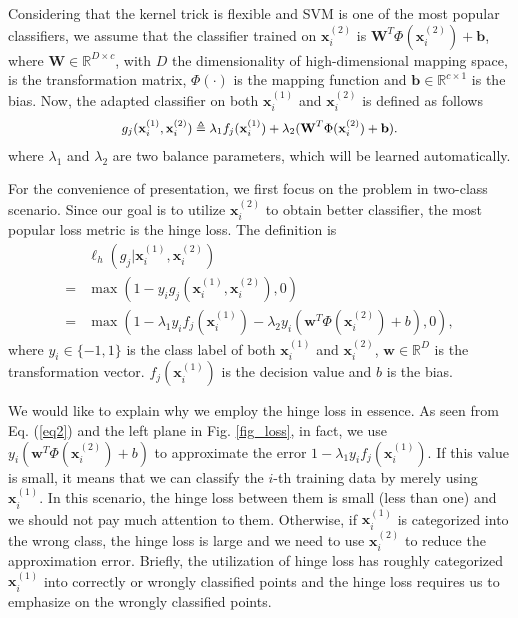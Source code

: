 \documentclass[10pt,journal,compsoc]{IEEEtran}
\begin{document}
Considering that the kernel trick is flexible and SVM is one of the most popular classifiers, we assume that the classifier trained on $\mathbf{x}_i^{(2)}$ is $\mathbf{W}^T \Phi(\mathbf{x}_i^{(2)})+\mathbf{b}$, where $\mathbf{W} \in \mathbb{R}^{D\times c}$, with $D$ the dimensionality of high-dimensional mapping space, is the transformation matrix, $\Phi(\cdot)$ is the mapping function and $\mathbf{b}\in \mathbb{R}^{c\times 1}$ is the bias. Now, the adapted classifier on both $\mathbf{x}_i^{(1)}$ and $\mathbf{x}_i^{(2)}$ is defined as follows
\begin{equation}
\label{eq1}
\small{
\begin{split}
g_j(\mathbf{x}_i^{(1)},\mathbf{x}_i^{(2)}) \triangleq \lambda_1 f_j(\mathbf{x}_i^{(1)})+\lambda_2 (\mathbf{W}^T \Phi(\mathbf{x}_i^{(2)})+\mathbf{b}).
\end{split}}
\end{equation}
where $\lambda_1$ and $\lambda_2$ are two balance parameters, which will be learned automatically.

For the convenience of presentation, we first focus on the problem in two-class scenario. Since our goal is to utilize $\mathbf{x}_i^{(2)}$ to obtain better classifier, the most popular loss metric is the hinge loss. The definition is
\begin{equation}
\label{eq2}
\begin{split}
 &\ell_h(g_j|\mathbf{x}_i^{(1)},\mathbf{x}_i^{(2)}) \\
=&\max(1-y_i g_j(\mathbf{x}_i^{(1)},\mathbf{x}_i^{(2)}), 0) \\
=&\max(1- \lambda_1 y_i f_j(\mathbf{x}_i^{(1)})- \lambda_2 y_i (\mathbf{w}^T \Phi(\mathbf{x}_i^{(2)})+b), 0),
\end{split}
\end{equation}
where $y_i \in \{-1,1\}$ is the class label of both $\mathbf{x}_i^{(1)}$ and $\mathbf{x}_i^{(2)}$, $\mathbf{w}\in \mathbb{R}^D$ is the transformation vector. $f_j(\mathbf{x}_i^{(1)})$ is the decision value and $b$ is the bias.

We would like to explain why we employ the hinge loss in essence. As seen from Eq. (\ref{eq2}) and the left plane in Fig. \ref{fig_loss}, in fact, we use $y_i(\mathbf{w}^T \Phi(\mathbf{x}_i^{(2)})+b)$ to approximate the error $1- \lambda_1 y_i f_j(\mathbf{x}_i^{(1)})$. If this value is small, it means that we can classify the $i$-th training data by merely using $\mathbf{x}_i^{(1)}$. In this scenario, the hinge loss between them is small (less than one) and we should not pay much attention to them. Otherwise, if $\mathbf{x}_i^{(1)}$ is categorized into the wrong class, the hinge loss is large and we need to use $\mathbf{x}_i^{(2)}$ to reduce the approximation error. Briefly, the utilization of hinge loss has roughly categorized $\mathbf{x}_i^{(1)}$ into correctly or wrongly classified points and the hinge loss requires us to emphasize on the wrongly classified points.
\end{document}
